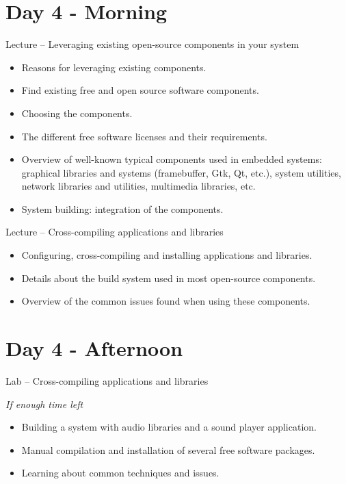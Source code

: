 \documentclass[a4paper,12pt,obeyspaces,spaces,hyphens]{article}
\begin{document}
\section{Day 4 - Morning}

\feagendatwocolumn
{Lecture – Leveraging existing open-source components in your system}
{
  \begin{itemize}
  \item Reasons for leveraging existing components.
  \item Find existing free and open source software components.
  \item Choosing the components.
  \item The different free software licenses and their requirements.
  \item Overview of well-known typical components used in
        embedded systems: graphical libraries and systems
        (framebuffer, Gtk, Qt, etc.), system utilities,
        network libraries and utilities, multimedia libraries, etc.
  \item System building: integration of the components.
  \end{itemize}
}
{Lecture – Cross-compiling applications and libraries}
{
  \begin{itemize}
  \item Configuring, cross-compiling and installing applications and libraries.
  \item Details about the build system used in most open-source components.
  \item Overview of the common issues found when using these components.
  \end{itemize}
}


\section{Day 4 - Afternoon}

\feagendaonecolumn
{Lab – Cross-compiling applications and libraries}
{
  {\em If enough time left}
  \begin{itemize}
  \item Building a system with audio libraries and a sound player application.
  \item Manual compilation and installation of several free software packages.
  \item Learning about common techniques and issues.
  \end{itemize}
}
\end{document}
